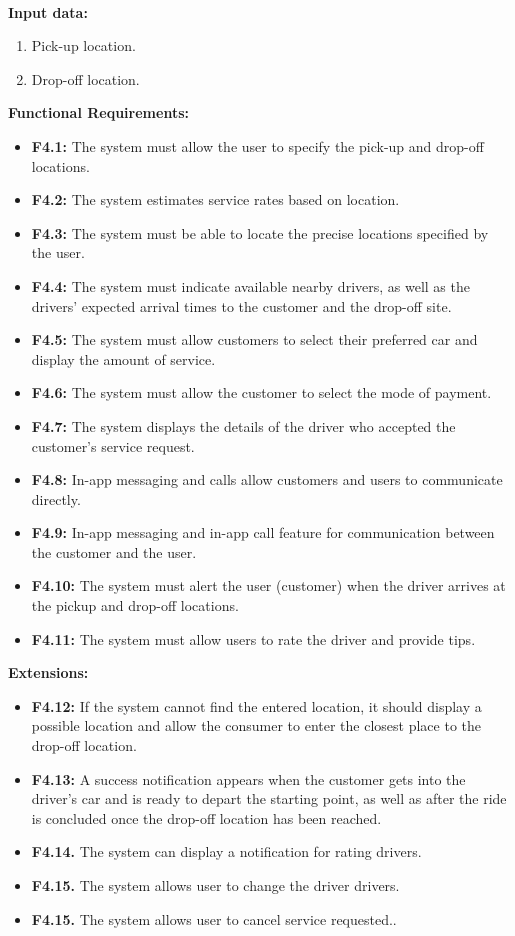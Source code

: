 \documentclass[9pt]{report}
\begin{document}
\textbf{\\Input data:}
\begin{enumerate}
    \item Pick-up location.
    \item Drop-off location.
\end{enumerate}
\textbf{Functional Requirements:}
\begin{itemize}
    \item \textbf{F4.1:} The system must allow the user to specify the pick-up and drop-off locations.
    \item \textbf{F4.2:} The system estimates service rates based on location.
    \item \textbf{F4.3:} The system must be able to locate the precise locations specified by the user.
    \item \textbf{F4.4:} The system must indicate available nearby drivers, as well as the drivers' expected arrival times to the customer and the drop-off site.
    \item \textbf{F4.5:} The system must allow customers to select their preferred car and display the amount of service.
    \item \textbf{F4.6:} The system must allow the customer to select the mode of payment.
    \item \textbf{F4.7:} The system displays the details of the driver who accepted the customer's service request.
    \item \textbf{F4.8:} In-app messaging and calls allow customers and users to communicate directly.
    \item \textbf{F4.9:} In-app messaging and in-app call feature for communication between the customer and the user.
    \item \textbf{F4.10:} The system must alert the user (customer) when the driver arrives at the pickup and drop-off locations.
    \item \textbf{F4.11:} The system must allow users to rate the driver and provide tips.
\end{itemize}
\textbf{Extensions:}
\begin{itemize}
    \item \textbf{F4.12:} If the system cannot find the entered location, it should display a possible location and allow the consumer to enter the closest place to the drop-off location.
    \item \textbf{F4.13:} A success notification appears when the customer gets into the driver's car and is ready to depart the starting point, as well as after the ride is concluded once the drop-off location has been reached.
    \item \textbf{F4.14.} The system can display a notification for rating drivers.
    \item \textbf{F4.15.} The system allows user to change the driver drivers.
    \item \textbf{F4.15.} The system allows user to cancel service requested..
\end{itemize}
\end{document}
